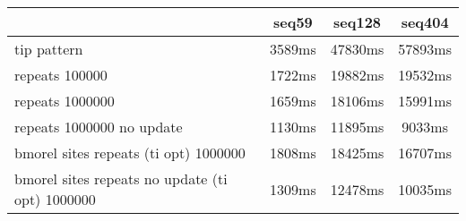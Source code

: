 \begin{tabular}{|l|c|c|c|}
\hline
 & seq59 & seq128 & seq404  \\
\hline
tip pattern & 3589ms & 47830ms & 57893ms\\
\hline
repeats 100000 & 1722ms & 19882ms & 19532ms\\
\hline
repeats 1000000 & 1659ms & 18106ms & 15991ms\\
\hline
repeats 1000000 no update & 1130ms & 11895ms & 9033ms\\
\hline
bmorel sites repeats (ti opt) 1000000 & 1808ms & 18425ms & 16707ms\\
\hline
bmorel sites repeats no update (ti opt) 1000000 & 1309ms & 12478ms & 10035ms\\
\hline
\end{tabular}
